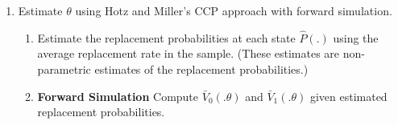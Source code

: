 \documentclass[11pt ]{article}
\begin{document}
\begin{enumerate}
        \item Estimate $\theta$ using Hotz and Miller's CCP approach with forward simulation. 

        
         \begin{enumerate}
                 \item  Estimate the replacement probabilities at each state $\hat P(.)$ using the average replacement rate in the sample. (These estimates are non-parametric estimates of the replacement probabilities.)
                        
                 
                \item \textbf{Forward Simulation} Compute $\bar V_{0}\left(. \theta \right)$ and $\bar V_{1}\left(. \theta \right)$ given estimated replacement probabilities. 
                \begin{enumerate}


\end{enumerate}
\end{enumerate}
\end{enumerate}
\end{document}
